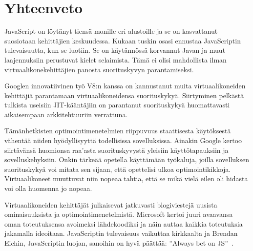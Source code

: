 \section{Yhteenveto}

JavaScript on löytänyt tiensä monille eri alustoille ja se on kasvattanut suosiotaan kehittäjien keskuudessa. Kukaan tuskin osasi ennustaa JavaScriptin tulevaisuutta, kun se luotiin. Se on käytännössä korvannut Javan ja muut laajennuksiin perustuvat kielet selaimista. Tämä ei olisi mahdollista ilman virtuaalikonekehittäjien panosta suorituskyvyn parantamiseksi.

Googlen innovatiivinen työ V8:n kanssa on kannustanut muita virtuaalikoneiden kehittäjiä parantamaan virtuaalikoneidensa suorituskykyä. Siirtyminen pelkästä tulkista useisiin JIT-kääntäjiin on parantanut suorituskykyä huomattavasti aikaisempaan arkkitehtuuriin verrattuna.

Tämänhetkisten optimointimenetelmien riippuvuus staattisesta käytöksestä vähentää niiden hyödyllisyyttä todellisissa sovelluksissa. Ainakin Google kertoo siirtävänsä huomionsa raa'asta suorituskyvystä yleisiin käyttötapauksiin ja sovelluskehyksiin. Onkin tärkeää opetella käyttämään työkaluja, joilla sovelluksen suorituskykyä voi mitata sen sijaan, että opettelisi ulkoa optimointikikkoja. Virtuaalikoneet muuttuvat niin nopeaa tahtia, että se mikä vielä eilen oli hidasta voi olla huomenna jo nopeaa.

Virtuaalikoneiden kehittäjät julkaisevat jatkuvasti blogiviestejä uusista ominaisuuksista ja optimointimenetelmistä. Microsoft kertoi juuri avaavansa oman toteutuksensa avoimeksi lähdekoodiksi ja näin auttaa kaikkia toteutuksia jakamalla ideoitaan. JavaScriptin tulevaisuus vaikuttaa kirkkaalta ja Brendan Eichin, JavaScriptin luojan, sanoihin on hyvä päättää: ''Always bet on JS''~\cite{beton}.
